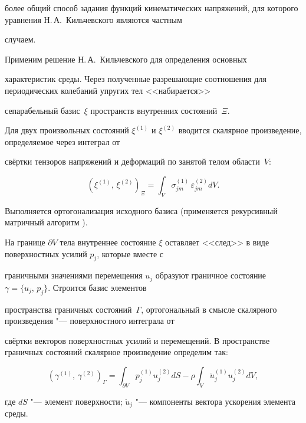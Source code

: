 более общий способ задания функций кинематических напряжений, для которого уравнения Н.\,А.~Кильчевского являются частным

случаем.



\smallskip



 Применим решение \linebreak Н.\,А.~Киль\-чевс\-кого для определения основных

характеристик среды. Через полученные разрешающие соотношения для периодических колебаний упругих тел <<набирается>>

сепарабельный базис~$\xi$ пространств внутренних состояний~$\Xi$.



Для двух произвольных состояний $\xi^{(1)}$ и $\xi ^{( 2 )}$ вводится скалярное произведение, определяемое через интеграл от

свёртки тензоров напряжений и деформаций по занятой телом области~$V$:

$$

\left( \xi^{( 1 )}, \, \xi^{( 2 )} \right)_{\Xi} = \int  _{V} \sigma _{jm}^{( 1 )} \, \varepsilon_{jm}^{( 2 )} dV.

$$

Выполняется ортогонализация исходного базиса (применяется рекурсивный матричный алгоритм \cite{penkov:SLV}).



На границе $\partial V$ тела внутреннее состояние $\xi$ оставляет <<след>> в виде поверхностных усилий $p _{j}$, которые вместе с

граничными значениями перемещения $u _{j}$ образуют граничное состояние $\gamma = \{u _{j},\,p _{j}\}$. Строится базис элементов

пространства граничных состояний~$\Gamma$, ортогональный в смысле скалярного произведения "--- поверхностного интеграла от

свёртки векторов поверхностных усилий и перемещений. В пространстве граничных состояний скалярное произведение определим так:

$$

\left( \gamma^{( 1 )}, \, \gamma ^{( 2 )} \right)_{\Gamma} = \int _{\partial V} p_{j}^{( 1 )} u _{j}^{( 2 )} dS - \rho

\int  _{V} \ddot{u} _{j}^{( 1 )} u _{j}^{(2)} dV,

$$

где $dS$ "--- элемент поверхности; $\ddot{u}_{j}$ "--- компоненты вектора ускорения элемента среды.



